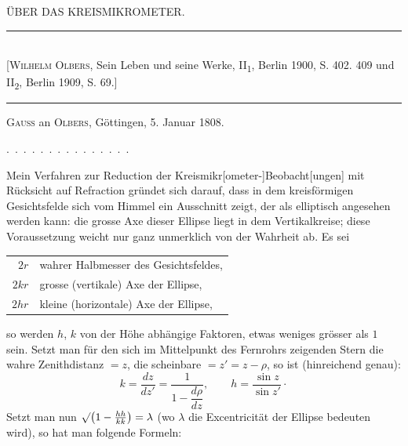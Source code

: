 \clearpage\begingroup
{}\NoSourceHead
\begin{center}\Large ÜBER DAS KREISMIKROMETER.\par\bigskip\large{}\end{center}
\begin{center}\small
\rule{\textwidth}{.35pt}\\[.2em]
[\textsc{Wilhelm Olbers}, Sein Leben und seine Werke, II\textsubscript{1}, Berlin 1900, S. 402. 409 und II\textsubscript{2}, Berlin 1909, S. 69.]\\[-.2em]
\rule{\textwidth}{.35pt}
\end{center}
\begin{center}\textsc{Gauss} an \textsc{Olbers}, Göttingen, 5. Januar 1808.\end{center}
\noindent\mbox{. . . . . . . . . . . . . . .}\par
\noindent\hspace*{\parindent}Mein Verfahren zur Reduction der Kreismikr[ometer-]Beobacht[ungen] mit Rücksicht auf Refraction gründet sich darauf, dass in dem kreisförmigen Gesichtsfelde sich vom Himmel ein Ausschnitt zeigt, der als elliptisch angesehen werden kann: die grosse Axe dieser Ellipse liegt in dem Vertikalkreise; diese Voraussetzung weicht nur ganz unmerklich von der Wahrheit ab. Es sei
\begin{center}\begin{tabular}{rl}
$2r$&wahrer Halbmesser des Gesichtsfeldes,\\
$2kr$&grosse (vertikale) Axe der Ellipse,\\
$2hr$&kleine (horizontale) Axe der Ellipse,
\end{tabular}\end{center}
\noindent so werden $h$, $k$ von der Höhe abhängige Faktoren, etwas weniges grösser als $1$ sein. Setzt man für den sich im Mittelpunkt des Fernrohrs zeigenden Stern die wahre Zenithdistanz $=z$, die scheinbare $=z'=z-\rho$, so ist (hinreichend genau):
\[
k=\frac{dz}{dz'}=\frac{1}{1-\dfrac{d\rho}{dz}},\qquad h=\frac{\sin z}{\sin z'}\mathpunct{\cdot}
\]
\noindent\hspace*{\parindent}Setzt man nun $\surd\bigl(1-\frac{hh}{kk}\bigr)=\lambda$ (wo $\lambda$ die Excentricität der Ellipse bedeuten wird), so hat man folgende Formeln:
